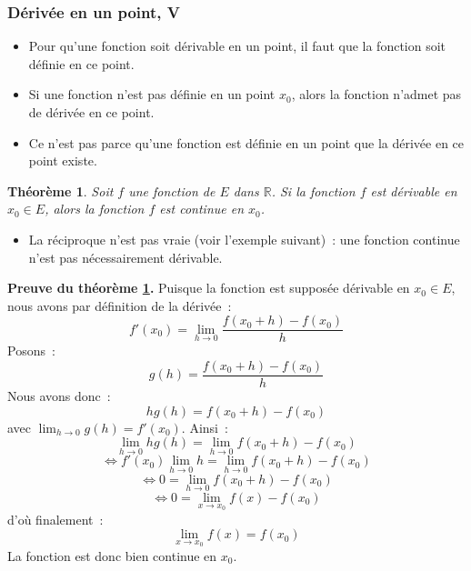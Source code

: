 \documentclass[10pt,notheorems]{beamer}
\theoremstyle{plain}
\newtheorem{theorem}{Théorème}
\theoremstyle{definition} %
\begin{document}
\begin{frame}
  \frametitle{Dérivée en un point, V}
  \hypertarget{slide_derivee_5}{}

  \begin{itemize}

  \item Pour qu'une fonction soit dérivable en un point, il faut que la fonction soit définie en ce point.\newline

  \item Si une fonction n'est pas définie en un point $x_0$, alors la fonction n'admet pas de dérivée en ce point.\newline

  \item[\dbend] Ce n'est pas parce qu'une fonction est définie en un point que la dérivée en ce point existe.\newline

  \end{itemize}

  \begin{theorem}\label{thm:derivable-continue}
    Soit $f$ une fonction de $E$ dans $\mathbb R$. Si la fonction $f$ est dérivable en $x_0\in E$, alors la fonction $f$ est continue en $x_0$.
  \end{theorem}

  \bigskip

  \begin{itemize}

  \item[\dbend] La réciproque n'est pas vraie (voir l'exemple suivant)~: une fonction continue n'est pas nécessairement dérivable.

  \end{itemize}

\end{frame}


\begin{notes}
  \textbf{Preuve du théorème
    \hyperlink{slide_derivee_5}{\ref{thm:derivable-continue}}.}
  Puisque la fonction est supposée dérivable en $x_0\in E$, nous avons
  par définition de la dérivée~:
  \[
    f'(x_0) = \lim_{h\rightarrow 0} \frac{f(x_0+h)-f(x_0)}{h}
  \]
  Posons~:
  \[
    g(h) =  \frac{f(x_0+h)-f(x_0)}{h}
  \]
  Nous avons donc~:
  \[
    h g(h) = f(x_0+h)-f(x_0)
  \]
  avec $\lim_{h\rightarrow 0}g(h) = f'(x_0)$. Ainsi~:
  \[
    \lim_{h\rightarrow 0} hg(h) = \lim_{h\rightarrow 0}f(x_0+h) - f(x_0)
  \]
  \[
    \Leftrightarrow f'(x_0)\lim_{h\rightarrow 0} h = \lim_{h\rightarrow 0}f(x_0+h) - f(x_0)
  \]
  \[
    \Leftrightarrow 0 = \lim_{h\rightarrow 0}f(x_0+h) - f(x_0)
  \]
  \[
    \Leftrightarrow 0 = \lim_{x\rightarrow x_0}f(x) - f(x_0)
  \]
  d'où finalement~:
  \[
    \lim_{x\rightarrow x_0}f(x) = f(x_0)
  \]
  La fonction est donc bien continue en $x_0$.

\end{notes}
\end{document}
